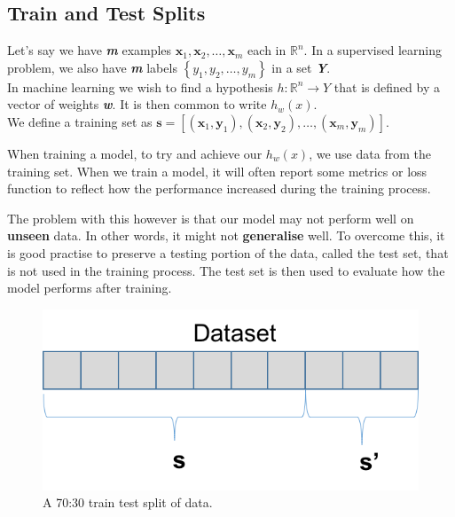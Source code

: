 \documentclass[12pt,a4paper,twoside]{report}
\begin{document}
\subsection{Train and Test Splits}
Let's say we have \textbf{\textit{m}} examples $ \mathbf { x } _ { 1} ,\mathbf { x } _ { 2} ,\dots ,\mathbf { x } _ { m }$ each in $\mathbb { R } ^ { n }$. In a supervised learning problem, we also have \textbf{\textit{m}} labels $\left\{ y _ { 1} ,y _ { 2} ,\dots ,y _ { m } \right\}$ in a set \textbf{\textit{Y}}.\\
In machine learning we wish to find a hypothesis $h : \mathbb { R } ^ { n } \rightarrow Y$ that is defined by a vector of weights \textbf{\textit{w}}. It is then common to write $h _ { w } ( x )$.\\

We define a training set as $\mathbf{s} = [(\mathbf { x } _ { 1}, \mathbf { y } _ { 1}),(\mathbf { x } _ { 2}, \mathbf { y } _ { 2}),\dots,(\mathbf { x } _ { m}, \mathbf { y } _ { m})]$.
 
When training a model, to try and achieve our $h _ { w } ( x )$, we use data from the training set. When we train a model, it will often report some metrics or loss function to reflect how the performance increased during the training process. 

The problem with this however is that our model may not perform well on \textbf{unseen} data. In other words, it might not \textbf{generalise} well. To overcome this, it is good practise to preserve a testing portion of the data, called the test set, that is not used in the training process. The test set is then used to evaluate how the model performs after training. 

\begin{figure}[H]

\centering
\includegraphics[scale=0.8]{train-test-split}
\caption{A 70:30 train test split of data.}
\end{figure}
\end{document}
